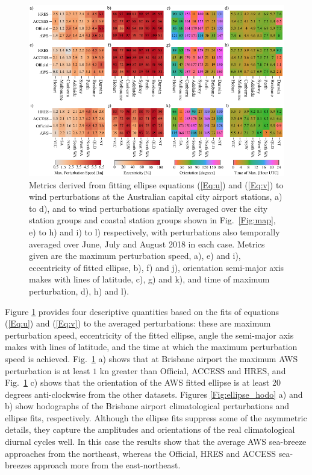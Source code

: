 \documentclass[twocol]{ametsoc}
\begin{document}
\begin{figure}
\centering
\includegraphics[width=39pc]{ellipse_fits.pdf}
\caption{Metrics derived from fitting ellipse equations (\ref{Eq:u}) and (\ref{Eq:v}) to wind perturbations at the Australian capital city airport stations, a) to d), and to wind perturbations spatially averaged over the city station groups and coastal station groups shown in Fig.~\ref{Fig:map}, e) to h) and i) to l) respectively, with perturbations also temporally averaged over June, July and August 2018 in each case. Metrics given are the maximum perturbation speed, a), e) and i), eccentricity of fitted ellipse, b), f) and j), orientation semi-major axis makes with lines of latitude, c), g) and k), and time of maximum perturbation, d), h) and l).}
\label{Fig:ellipse_fits}
\end{figure}

Figure \ref{Fig:ellipse_fits} provides four descriptive quantities based on the fits of equations (\ref{Eq:u}) and (\ref{Eq:v}) to the averaged perturbations: these are maximum perturbation speed, eccentricity of the fitted ellipse, angle the semi-major axis makes with lines of latitude, and the time at which the maximum perturbation speed is achieved. Fig.~\ref{Fig:ellipse_fits} a) shows that at Brisbane airport the maximum AWS perturbation is at least $1$ kn greater than Official, ACCESS and HRES, and Fig.~\ref{Fig:ellipse_fits} c) shows that the orientation of the AWS fitted ellipse is at least 20 degrees anti-clockwise from the other datasets. Figures \ref{Fig:ellipse_hodo} a) and b) show hodographs of the Brisbane airport climatological perturbations and ellipse fits, respectively. Although the ellipse fits suppress some of the asymmetric details, they capture the amplitudes and orientations of the real climatological diurnal cycles well. In this case the results show that the average AWS sea-breeze approaches from the northeast, whereas the Official, HRES and ACCESS sea-breezes approach more from the east-northeast. 
\end{document}
